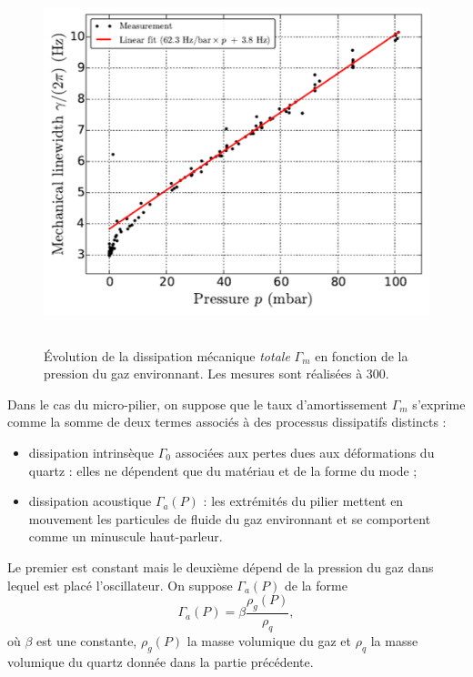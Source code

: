 \documentclass[12pt,a4paper]{exam}
\begin{document}
\begin{figure}
\center
\includegraphics[height=300pt]{figures/gaz_damping.png}
\caption{Évolution de la dissipation mécanique \emph{totale} $\Gamma_m$ en fonction de la pression du gaz environnant.
Les mesures sont réalisées à \unit{300}{\kelvin}.}
\label{fig:gaz_damping}
\end{figure}

Dans le cas du micro-pilier, on suppose que le taux d'amortissement $\Gamma_m$ s'exprime comme la somme de deux termes associés à des processus dissipatifs distincts :
\begin{itemize}
\item dissipation intrinsèque $\Gamma_0$ associées aux pertes dues aux déformations du quartz : elles ne dépendent que du matériau et de la forme du mode ;
\item dissipation acoustique $\Gamma_a(P)$ : les extrémités du pilier mettent en mouvement les particules de fluide du gaz environnant et se comportent comme un minuscule haut-parleur. 
\end{itemize}
Le premier est constant mais le deuxième dépend de la pression du gaz dans lequel est placé l'oscillateur.
On suppose $\Gamma_a(P)$ de la forme
\begin{equation}
\Gamma_a(P) = \beta \frac{\rho_g(P)}{\rho_q},
\end{equation}
où $\beta$ est une constante, $\rho_g(P)$ la masse volumique du gaz et $\rho_q$ la masse volumique du quartz donnée dans la partie précédente.
\end{document}

